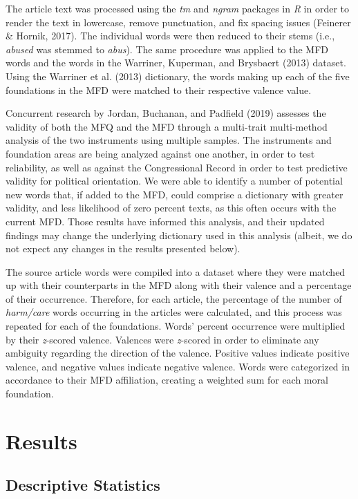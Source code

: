 \documentclass[
  english,
  man,floatsintext]{apa6}
\begin{document}
The article text was processed using the \emph{tm} and \emph{ngram} packages in \emph{R} in order to render the text in lowercase, remove punctuation, and fix spacing issues (Feinerer \& Hornik, 2017). The individual words were then reduced to their stems (i.e., \emph{abused} was stemmed to \emph{abus}). The same procedure was applied to the MFD words and the words in the Warriner, Kuperman, and Brysbaert (2013) dataset. Using the Warriner et al. (2013) dictionary, the words making up each of the five foundations in the MFD were matched to their respective valence value.

Concurrent research by Jordan, Buchanan, and Padfield (2019) assesses the validity of both the MFQ and the MFD through a multi-trait multi-method analysis of the two instruments using multiple samples. The instruments and foundation areas are being analyzed against one another, in order to test reliability, as well as against the Congressional Record in order to test predictive validity for political orientation. We were able to identify a number of potential new words that, if added to the MFD, could comprise a dictionary with greater validity, and less likelihood of zero percent texts, as this often occurs with the current MFD. Those results have informed this analysis, and their updated findings may change the underlying dictionary used in this analysis (albeit, we do not expect any changes in the results presented below).

The source article words were compiled into a dataset where they were matched up with their counterparts in the MFD along with their valence and a percentage of their occurrence. Therefore, for each article, the percentage of the number of \emph{harm/care} words occurring in the articles were calculated, and this process was repeated for each of the foundations. Words' percent occurrence were multiplied by their \emph{z}-scored valence. Valences were \emph{z}-scored in order to eliminate any ambiguity regarding the direction of the valence. Positive values indicate positive valence, and negative values indicate negative valence. Words were categorized in accordance to their MFD affiliation, creating a weighted sum for each moral foundation.

\hypertarget{results}{%
\section{Results}\label{results}}

\hypertarget{descriptive-statistics}{%
\subsection{Descriptive Statistics}\label{descriptive-statistics}}
\end{document}
